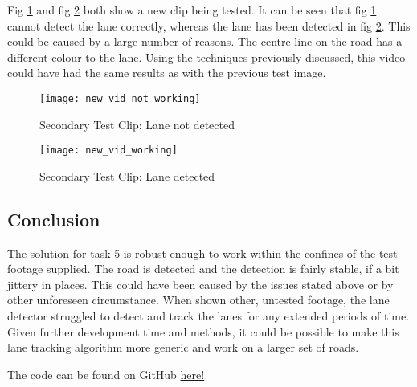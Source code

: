 \documentclass[conference]{IEEEtran}
\begin{document}
Fig \ref{fig:new_vid_not_working} and fig \ref{fig:new_vid_working} both show a new clip being tested. It can be seen that fig \ref{fig:new_vid_not_working} cannot detect the lane correctly, whereas the lane has been detected in fig \ref{fig:new_vid_working}. This could be caused by a large number of reasons. The centre line on the road has a different colour to the lane. Using the techniques previously discussed, this video could have had the same results as with the previous test image. 

\begin{figure}[H]
\centerline{\texttt{[image: new\_vid\_not\_working]}}
\caption{Secondary Test Clip: Lane not detected}
\label{fig:new_vid_not_working}
\end{figure}

\begin{figure}[H]
\centerline{\texttt{[image: new\_vid\_working]}}
\caption{Secondary Test Clip: Lane detected}
\label{fig:new_vid_working}
\end{figure}

\subsection{Conclusion}

The solution for task 5 is robust enough to work within the confines of the test footage supplied. The road is detected and the detection is fairly stable, if a bit jittery in places. This could have been caused by the issues stated above or by other unforeseen circumstance. When shown other, untested footage, the lane detector struggled to detect and track the lanes for any extended periods of time. Given further development time and methods, it could be possible to make this lane tracking algorithm more generic and work on a larger set of roads. 




The code can be found on GitHub \href{https://github.com/LukeDWaller99/Aint308}{here!} 

\onecolumn
\end{document}
